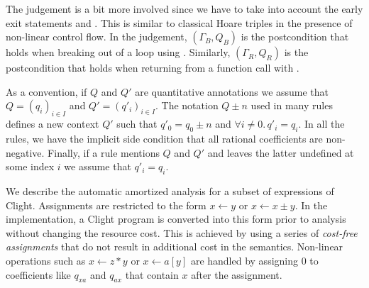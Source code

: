 \documentclass[nocopyrightspace,preprint,pldi]{sigplanconf-pldi15}
\newcommand{\iffull}[2]{\ifx\fullversion\undefined{#2}\else{#1}\fi}
\begin{document}
The judgement is a bit more involved since we have to take into
account the early exit statements  and .
This is similar to classical Hoare triples in the presence of non-linear
control flow. In the judgement, $(\Gamma_B, Q_B)$ is the postcondition
that holds when breaking out of a loop using .  %
Similarly, $(\Gamma_R, Q_R)$ is the postcondition that holds when
returning from a function call with . \iffull{(This becomes clear
in the rules.)}{}


As a convention, if $Q$ and $Q'$ are quantitative annotations
we assume that $Q = (q_i)_{i\in I}$ and $Q' = (q'_i)_{i \in I}$.
The notation $Q \pm n$ used in many rules defines a new context $Q'$
such that $q'_0 = q_0 \pm n$ and $\forall i \neq 0 .\, q'_i = q_i$.
In all the rules, we have the implicit side condition that all rational
coefficients are non-negative.  Finally, if a rule mentions $Q$ and $Q'$
and leaves the latter undefined at some index $i$ we assume that $q'_i = q_i$.

We describe the automatic amortized analysis for a subset of
expressions of Clight.  Assignments are restricted to the form $x \gets
y$ or $x \gets x \pm y$.  In the implementation, a Clight
program is converted into this form prior to analysis without changing
the resource cost.  This is achieved by using a series of \emph{cost-free
  assignments} that do not result in additional cost in the
semantics.  Non-linear operations such as $x \gets z*y$ or $x \gets
a[y]$ are handled by assigning $0$ to coefficients
like $q_{xa}$ and $q_{ax}$ that contain $x$ after the assignment.
\end{document}
